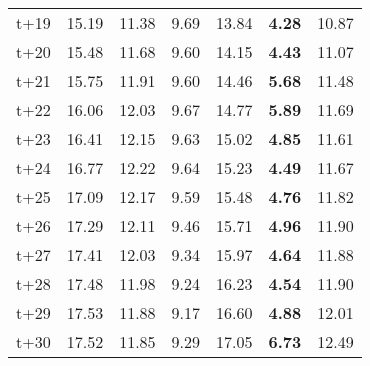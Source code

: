 \begin{table}[H]
\begin{tabular}{lrrrrrr}
t+19  & 15.19  & 11.38  & 9.69  & 13.84  & \textbf{4.28}  & 10.87  \\
t+20  & 15.48  & 11.68  & 9.60  & 14.15  & \textbf{4.43}  & 11.07  \\
t+21  & 15.75  & 11.91  & 9.60  & 14.46  & \textbf{5.68}  & 11.48  \\
t+22  & 16.06  & 12.03  & 9.67  & 14.77  & \textbf{5.89}  & 11.69  \\
t+23  & 16.41  & 12.15  & 9.63  & 15.02  & \textbf{4.85}  & 11.61  \\
t+24  & 16.77  & 12.22  & 9.64  & 15.23  & \textbf{4.49}  & 11.67  \\
t+25  & 17.09  & 12.17  & 9.59  & 15.48  & \textbf{4.76}  & 11.82  \\
t+26  & 17.29  & 12.11  & 9.46  & 15.71  & \textbf{4.96}  & 11.90  \\
t+27  & 17.41  & 12.03  & 9.34  & 15.97  & \textbf{4.64}  & 11.88  \\
t+28  & 17.48  & 11.98  & 9.24  & 16.23  & \textbf{4.54}  & 11.90  \\
t+29  & 17.53  & 11.88  & 9.17  & 16.60  & \textbf{4.88}  & 12.01  \\
t+30  & 17.52  & 11.85  & 9.29  & 17.05  & \textbf{6.73}  & 12.49  \\

\bottomrule
\end{tabular}
\end{table}
